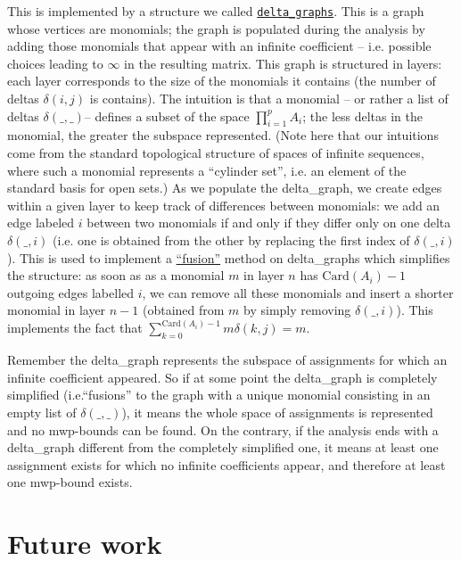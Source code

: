 \documentclass[runningheads]{llncs}
\makeatletter
\newcommand*{\ie}{i.e.\@\xspace}
\makeatother
\begin{document}
This is implemented by a structure we called \href{https://github.com/seiller/pymwp/blob/946a5b44692325095392694950ed03807f059b52/pymwp/delta_graphs.py}{\texttt{delta\_graphs}}.
This is a graph whose vertices are monomials; the graph is populated during the analysis by adding those monomials that appear with an infinite coefficient -- \ie possible choices leading to \(\infty\) in the resulting matrix.
This graph is structured in layers: each layer corresponds to the size of the monomials it contains (the number of deltas \(\delta(i,j)\) is contains). The intuition is that a monomial -- or rather a list of deltas $\delta(\_,\_)$-- defines a subset of the space \(\prod_{i=1}^{p} A_i\); the less deltas in the monomial, the greater the subspace represented. (Note here that our intuitions come from the standard topological structure of spaces of infinite sequences, where such a monomial represents a \enquote{cylinder set}, \ie an element of the standard basis for open sets.) As we populate the delta\_graph, we create edges within a given layer to keep track of differences between monomials: we add an edge labeled \(i\) between two monomials if and only if they differ only on one delta \(\delta(\_,i)\) (\ie one is obtained from the other by replacing the first index of \(\delta(\_,i)\)). This is used to implement a \href{https://github.com/seiller/pymwp/blob/946a5b44692325095392694950ed03807f059b52/pymwp/delta_graphs.py#L274}{\enquote{fusion}} method on delta\_graphs which simplifies the structure: as soon as as a monomial \(m\) in layer \(n\) has \(\mathrm{Card}(A_i)-1\) outgoing edges labelled \(i\), we can remove all these monomials and insert a shorter monomial in layer \(n-1\) (obtained from \(m\) by simply removing \(\delta(\_,i)\)). This implements the fact that \(\sum_{k=0}^{\mathrm{Card}(A_i)-1} m \delta(k,j) = m\).

Remember the delta\_graph represents the subspace of assignments for which an infinite coefficient appeared. So if at some point the delta\_graph is completely simplified (\ie \enquote{fusions} to the graph with a unique monomial consisting in an empty list of \(\delta(\_,\_)\)), it means the whole space of assignments is represented and no mwp-bounds can be found. On the contrary, if the analysis ends with a delta\_graph different from the completely simplified one, it means at least one assignment exists for which no infinite coefficients appear, and therefore at least one mwp-bound exists.

\section{Future work}
\end{document}
